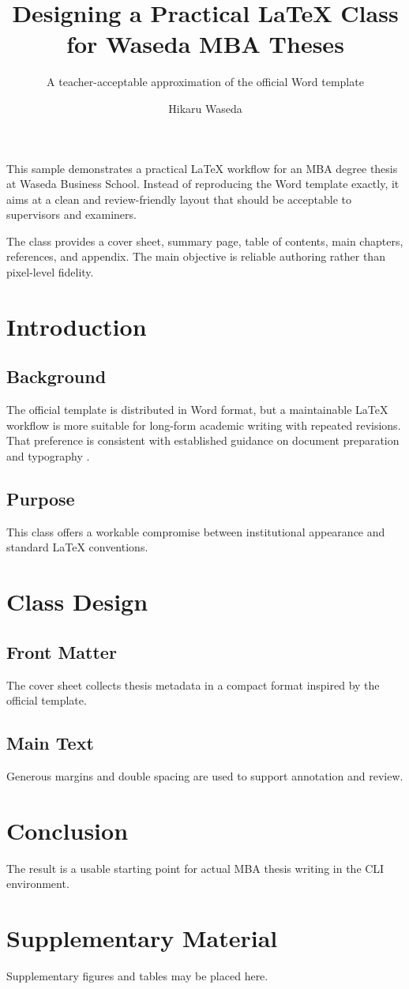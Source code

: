 \documentclass[degree-en]{wbsmba}
\title{Designing a Practical LaTeX Class for Waseda MBA Theses}
\subtitle{A teacher-acceptable approximation of the official Word template}
\author{Hikaru Waseda}
\begin{document}
\maketitle

\begin{abstractpage}
This sample demonstrates a practical LaTeX workflow for an MBA degree thesis at Waseda Business School.
Instead of reproducing the Word template exactly, it aims at a clean and review-friendly layout that should
be acceptable to supervisors and examiners.

The class provides a cover sheet, summary page, table of contents, main chapters, references, and appendix.
The main objective is reliable authoring rather than pixel-level fidelity.
\end{abstractpage}

\wbsfrontmatter
\tableofcontents
\wbsmainmatter

\chapter{Introduction}
\section{Background}
The official template is distributed in Word format, but a maintainable LaTeX workflow is more suitable for
long-form academic writing with repeated revisions.
That preference is consistent with established guidance on document preparation and typography
\cite{bringhurst2013elements,lamport1994latex}.

\section{Purpose}
This class offers a workable compromise between institutional appearance and standard LaTeX conventions.

\chapter{Class Design}
\section{Front Matter}
The cover sheet collects thesis metadata in a compact format inspired by the official template.

\section{Main Text}
Generous margins and double spacing are used to support annotation and review.

\chapter{Conclusion}
The result is a usable starting point for actual MBA thesis writing in the CLI environment.




\appendix
\chapter{Supplementary Material}
Supplementary figures and tables may be placed here.
\end{document}
